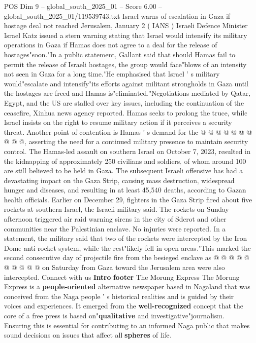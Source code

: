 \begin{textsample}{POS Dim 9 – global\_south\_2025\_01 – Score 6.00 – global\_south\_2025\_01/119539743.txt}  \label{ex:f9_pos_343}
Israel warns of escalation in Gaza if hostage deal not reached Jerusalem, January 2 ( IANS ) Israeli Defence Minister Israel Katz issued a stern warning stating that Israel would intensify its military operations in Gaza if Hamas does not agree to a deal for the release of hostages"soon."In a public statement, Gallant said that should Hamas fail to permit the release of Israeli hostages, the group would face"blows of an intensity not seen in Gaza for a long time."He emphasised that Israel ' s military would"escalate and intensify"its efforts against militant strongholds in Gaza until the hostages are freed and Hamas is"eliminated."Negotiations mediated by Qatar, Egypt, and the US are stalled over key issues, including the continuation of the ceasefire, Xinhua news agency reported.
Hamas seeks to prolong the truce, while Israel insists on the right to resume military action if it perceives a security threat.
Another point of contention is Hamas ' s demand for the @ @ @ @ @ @ @ @ @ @, asserting the need for a continued military presence to maintain security control.
The Hamas-led assault on southern Israel on October 7, 2023, resulted in the kidnapping of approximately 250 civilians and soldiers, of whom around 100 are still believed to be held in Gaza.
The subsequent Israeli offensive has had a devastating impact on the Gaza Strip, causing mass destruction, widespread hunger and diseases, and resulting in at least 45,540 deaths, according to Gazan health officials.
Earlier on December 29, fighters in the Gaza Strip fired about five rockets at southern Israel, the Israeli military said.
The rockets on Sunday afternoon triggered air raid warning sirens in the city of Sderot and other communities near the Palestinian enclave.
No injuries were reported.
In a statement, the military said that two of the rockets were intercepted by the Iron Dome anti-rocket system, while the rest"likely fell in open areas."This marked the second consecutive day of projectile fire from the besieged enclave as @ @ @ @ @ @ @ @ @ @ on Saturday from Gaza toward the Jerusalem area were also intercepted.
Connect with us \textbf{Intro} \textbf{footer} The Morung Express The Morung Express is a \textbf{people-oriented} alternative newspaper based in Nagaland that was conceived from the Naga people ' s historical realities and is guided by their voices and experiences.
It emerged from the \textbf{well-recognized} concept that the core of a free press is based on"\textbf{qualitative} and investigative"journalism.
Ensuring this is essential for contributing to an informed Naga public that makes sound decisions on issues that affect all \textbf{spheres} of life.

\end{textsample}
